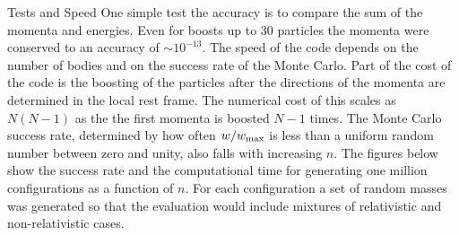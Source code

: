 \documentclass[11pt]{article}
\begin{document}
{\rm Tests and Speed}
One simple test the accuracy is to compare the sum of the momenta and energies. Even for boosts up to 30 particles the momenta were conserved to an accuracy of $\sim 10^{-13}$. The speed of the code depends on the number of bodies and on the success rate of the Monte Carlo. Part of the cost of the code is the boosting of the particles after the directions of the momenta are determined in the local rest frame. The numerical cost of this scales as $N(N-1)$ as the the first momenta is boosted $N-1$ times. The Monte Carlo success rate, determined by how often $w/w_{\rm max}$ is less than a uniform random number between zero and unity, also falls with increasing $n$. The figures below show the success rate and the computational time for generating one million configurations as a function of $n$. For each configuration a set of random masses was generated so that the evaluation would include mixtures of relativistic and non-relativistic cases. 
\end{document}

